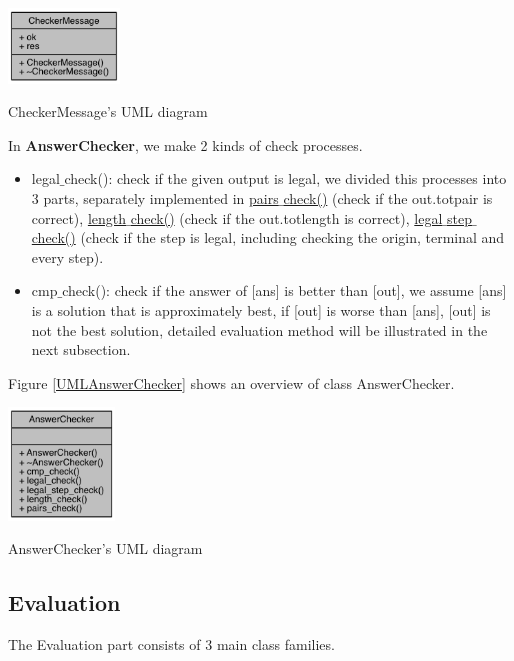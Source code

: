 \documentclass[twocolumn]{article}
\begin{document}
\begin{center}
\makeatletter
\def\@captype{figure}
\makeatother
\includegraphics [height=2cm]{UMLCheckerMessage}
\caption{CheckerMessage's UML diagram}
\label{UMLCheckerMessage}
\end{center}

In \textbf{AnswerChecker}, we make 2 kinds of check processes.

\begin{itemize}
    \item legal$\_$check(): check if the given output is legal, we divided this processes into 3 parts, separately implemented in \underline{pairs$\_$check()} (check if the out.totpair is correct), \underline{length$\_$check()} (check if the out.totlength is correct), \underline{legal$\_$step$\_$check()} (check if the step is legal, including checking the origin, terminal and every step).
    \item cmp$\_$check(): check if the answer of [ans] is better than [out], we assume [ans] is a solution that is approximately best, if [out] is worse than [ans], [out] is not the best solution, detailed evaluation method will be illustrated in the next subsection.
\end{itemize}

Figure \ref{UMLAnswerChecker} shows an overview of class AnswerChecker.

\begin{center}
\makeatletter
\def\@captype{figure}
\makeatother
\includegraphics [height=3cm]{UMLAnswerChecker}
\caption{AnswerChecker's UML diagram}
\label{UMLAnswerChecker}
\end{center}

\subsection{Evaluation}

The Evaluation part consists of 3 main class families.
\end{document}
